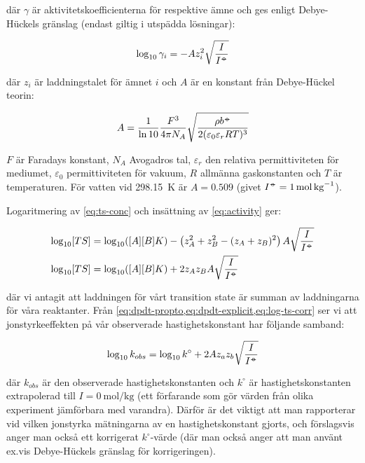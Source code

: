 där $\gamma$ är aktivitetskoefficienterna för respektive ämne och ges
enligt Debye-Hückels gränslag (endast giltig i utspädda lösningar):

\begin{equation}
  \label{eq:activity}
  \log_{10}\gamma_i = -Az_i^2\sqrt{\frac{I}{I^{-\kern-5pt{\circ}\kern-5pt-}}}
\end{equation}

där $z_i$ är laddningstalet för ämnet $i$ och $A$ är en konstant från Debye-Hückel teorin:

\begin{equation}
  \label{eq:debye-huckel-a}
  A = \frac{1}{\ln 10} \frac{F^3}{4\pi N_A}\sqrt{\frac{\rho b^{-\kern-5pt{\circ}\kern-5pt-}}{2(\varepsilon_0\varepsilon_rRT)^3}}
\end{equation}

$F$ är Faradays konstant, $N_A$ Avogadros tal, $\varepsilon_r$ den
relativa permittiviteten för mediumet, $\varepsilon_0$ permittiviteten för
vakuum, $R$ allmänna gaskonstanten och $T$ är temperaturen. För vatten vid
\SI{298.15}{\kelvin} är $A = 0.509$ (givet $I^\plimsoll =
\SI{1}{\mole\per\kg}$).

Logaritmering av \cref{eq:ts-conc} och insättning av \cref{eq:activity}
ger:

\begin{align}
  \log_{10}[TS] &= \log_{10}([A][B]K) - \left(z_A^2 + z_B^2 - (z_A+z_B)^2\right) A
                  \sqrt{\frac{I}{I^{-\kern-5pt{\circ}\kern-5pt-}}} \\
  \label{eq:log-ts-corr}
  \log_{10}[TS] &= \log_{10}([A][B]K) + 2z_Az_BA\sqrt{\frac{I}{I^{-\kern-5pt{\circ}\kern-5pt-}}}
\end{align}

där vi antagit att laddningen för vårt transition state är summan av
laddningarna för våra reaktanter.
Från \cref{eq:dpdt-propto,eq:dpdt-explicit,eq:log-ts-corr} ser vi att jonstyrkeeffekten
på vår observerade hastighetskonstant har följande samband:

\begin{equation}
  \label{eq:kinetic-salt}
  \log_{10} k_{obs} = \log_{10} k^{\circ} + 2Az_az_b\sqrt{\frac{I}{I^{-\kern-5pt{\circ}\kern-5pt-}}}
\end{equation}

där $k_{obs}$ är den observerade hastighetskonstanten och $k^{\circ}$ är
hastighetskonstanten extrapolerad till $I = \SI{0}{\mole\per\kg}$ (ett
förfarande som gör värden från olika experiment jämförbara med
varandra). Därför är det viktigt att man rapporterar vid vilken jonstyrka
mätningarna av en hastighetskonstant gjorts, och förslagsvis anger man
också ett korrigerat $k^\circ$-värde (där man också anger att man använt
ex.vis Debye-Hückels gränslag för korrigeringen).

